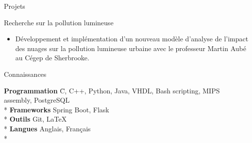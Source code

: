 \documentclass{article}
\newlength{\tabin}
\newlength{\secsep}
\newcommand{\lineunder}{\vspace*{-8pt} \\ \hspace*{-6pt} \hrulefill \\ \vspace*{-15pt}}
\newenvironment{tabbedsection}[1]{
  \begin{list}{}{
      \setlength{\itemsep}{0pt}
      \setlength{\labelsep}{0pt}
      \setlength{\labelwidth}{0pt}
      \setlength{\leftmargin}{\tabin}
      \setlength{\rightmargin}{\tabin}
      \setlength{\listparindent}{0pt}
      \setlength{\parsep}{0pt}
      \setlength{\parskip}{0pt}
      \setlength{\partopsep}{0pt}
      \setlength{\topsep}{#1}
    }
  \item[]
}{\end{list}}
\newenvironment{nospacetabbing}{
    \begin{tabbing}
}{\end{tabbing}\vspace{-1.2em}}
\newenvironment{resume_section}[1]{
  \filbreak
  \vspace{2\secsep}
  \textsc{\large#1}
  \lineunder
  \begin{tabbedsection}{\secsep}
}{\end{tabbedsection}}
\newenvironment{resume_subsection}[2][]{
  \textbf{#2} \hfill {\footnotesize #1} \hspace{2em}
  \begin{tabbedsection}{0.5\secsep}
}{\end{tabbedsection}}
\newenvironment{subitems}{
  \renewcommand{\labelitemi}{-}
  \begin{itemize}
      \setlength{\labelsep}{1em}
}{\end{itemize}}
\begin{document}
\begin{resume_section}{Projets}
    \begin{resume_subsection}[2014-2015]{Recherche sur la pollution lumineuse}
        \begin{subitems}
        \item Développement et implémentation d'un nouveau modèle d'analyse de l'impact des nuages sur la pollution lumineuse urbaine avec le professeur Martin Aubé au Cégep de Sherbrooke.
        \end{subitems}
    \end{resume_subsection}
\end{resume_section}

\begin{resume_section}{Connaissances}
\begin{nospacetabbing}

  \textbf{Programmation}  \= C, C++, Python, Java, VHDL, Bash scripting, MIPS assembly, PostgreSQL\\*
  \textbf{Frameworks} \> Spring Boot, Flask\\*
  \textbf{Outils} \> Git, \LaTeX \\*
  \textbf{Langues} \> Anglais, Français\\*
\end{nospacetabbing}
\end{resume_section}


\end{document}
